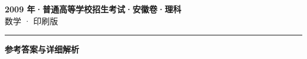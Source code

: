 \documentclass[zihao=5, a4paper]{ctexart}
\begin{document}
\begin{center}
  {\Large\bfseries 2009 年·普通高等学校招生考试·安徽卷·理科}\\[4pt]
  {\large 数学 · 印刷版}
\end{center}
\medskip
{}

\par\bigskip\hrule\bigskip
{}
\begin{center}{\large\bfseries 参考答案与详细解析}\end{center}
\smallskip

\end{document}
